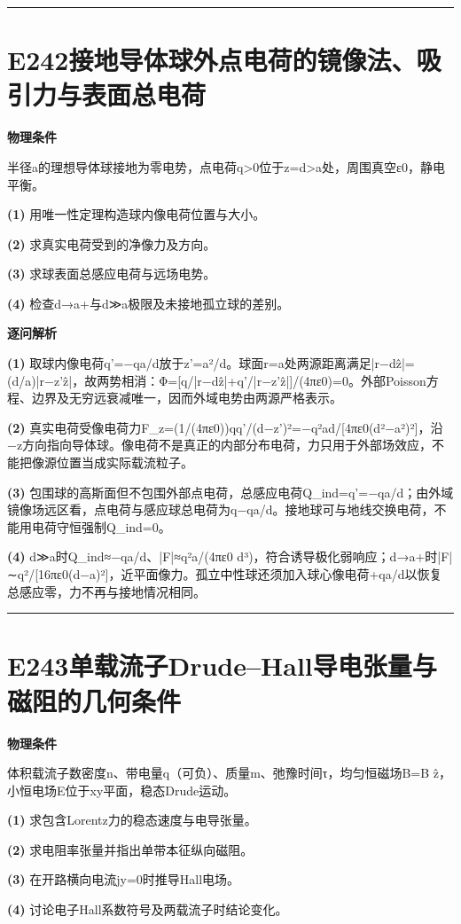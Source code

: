 \documentclass[UTF8,a4paper,11pt,oneside,openany]{ctexbook}
\begin{document}
\par\bigskip\hrule\bigskip
\section*{E242\quad 接地导体球外点电荷的镜像法、吸引力与表面总电荷}
\textbf{物理条件}\par 半径a的理想导体球接地为零电势，点电荷q>0位于z=d>a处，周围真空ε0，静电平衡。
\par\noindent\textbf{(1)} 用唯一性定理构造球内像电荷位置与大小。
\par\noindent\textbf{(2)} 求真实电荷受到的净像力及方向。
\par\noindent\textbf{(3)} 求球表面总感应电荷与远场电势。
\par\noindent\textbf{(4)} 检查d→a+与d≫a极限及未接地孤立球的差别。

\par\medskip\noindent\textbf{逐问解析}
\par\noindent\textbf{(1)} 取球内像电荷q'=−qa/d放于z'=a²/d。球面r=a处两源距离满足|r−dẑ|=(d/a)|r−z'ẑ|，故两势相消：Φ=[q/|r−dẑ|+q'/|r−z'ẑ|]/(4πε0)=0。外部Poisson方程、边界及无穷远衰减唯一，因而外域电势由两源严格表示。
\par\noindent\textbf{(2)} 真实电荷受像电荷力F\_z=(1/(4πε0))qq'/(d−z')²=−q²ad/[4πε0(d²−a²)²]，沿−z方向指向导体球。像电荷不是真正的内部分布电荷，力只用于外部场效应，不能把像源位置当成实际载流粒子。
\par\noindent\textbf{(3)} 包围球的高斯面但不包围外部点电荷，总感应电荷Q\_ind=q'=−qa/d；由外域镜像场远区看，点电荷与感应球总电荷为q−qa/d。接地球可与地线交换电荷，不能用电荷守恒强制Q\_ind=0。
\par\noindent\textbf{(4)} d≫a时Q\_ind≈−qa/d、|F|≈q²a/(4πε0 d³)，符合诱导极化弱响应；d→a+时|F|∼q²/[16πε0(d−a)²]，近平面像力。孤立中性球还须加入球心像电荷+qa/d以恢复总感应零，力不再与接地情况相同。

\par\bigskip\hrule\bigskip
\section*{E243\quad 单载流子Drude–Hall导电张量与磁阻的几何条件}
\textbf{物理条件}\par 体积载流子数密度n、带电量q（可负）、质量m、弛豫时间τ，均匀恒磁场B=B ẑ，小恒电场E位于xy平面，稳态Drude运动。
\par\noindent\textbf{(1)} 求包含Lorentz力的稳态速度与电导张量。
\par\noindent\textbf{(2)} 求电阻率张量并指出单带本征纵向磁阻。
\par\noindent\textbf{(3)} 在开路横向电流jy=0时推导Hall电场。
\par\noindent\textbf{(4)} 讨论电子Hall系数符号及两载流子时结论变化。
\end{document}
